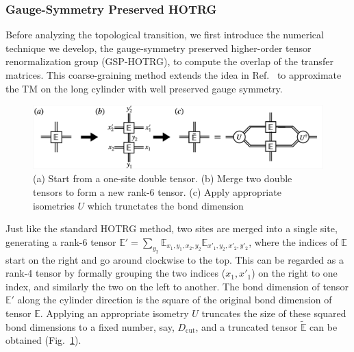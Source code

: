 \documentclass{ntuthesis}
\begin{document}
\subsubsection{Gauge-Symmetry Preserved HOTRG}

Before analyzing the topological transition, we first introduce the numerical technique we develop, the gauge-symmetry preserved higher-order tensor renormalization group (GSP-HOTRG), to compute the overlap of the transfer matrices. This coarse-graining method extends the idea in Ref.~\cite{GSPRG_2014} to approximate the TM on the long cylinder with well preserved gauge symmetry.

\begin{figure}[t]
 \centering
\includegraphics[width=\linewidth]{coarse_grain}
\caption{(a) Start from a one-site double tensor. (b) Merge two double tensors to form a new rank-6 tensor. (c) Apply appropriate isometries $U$ which trunctates the bond dimension}  
\label{fig:coarse_grain}
\end{figure}


Just like the standard HOTRG method, two sites are merged into a single site, generating a rank-6 tensor  $\mathbb{ E'} =  \sum_{y_2} \mathbb{ E}_{x_1,y_1,x_2,y_2}  \mathbb{ E}_{x'_1,y_2,x'_2,y'_2} $, 
where the indices of $\mathbb{ E} $ start on the right and go around clockwise to the top. 
%
This can be regarded as a rank-4 tensor by formally grouping the two indices ($x_1, x'_1$) on the right to one index, and similarly the two on the left to another. 
%
The bond dimension of tensor  $\mathbb{ E'}$  along the cylinder direction is the square of the original bond dimension of tensor $\mathbb{ E}$. 
%
Applying an appropriate isometry $U$ truncates the size of these squared bond dimensions to a fixed number, say, $D_\text{cut}$, and a truncated tensor $ \tilde { \mathbb{ E}}$ can be obtained (Fig.~\ref{fig:coarse_grain}).
\end{document}
